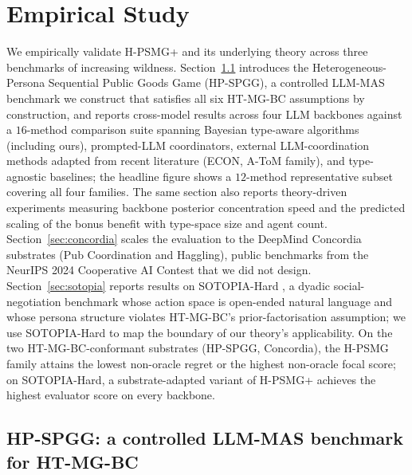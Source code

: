 \documentclass{article}
\def\textsuperscript#1{#1}%
\begin{document}
\section{Empirical Study}
\label{sec:experiments-llm}

We empirically validate H-PSMG\textsuperscript{+} and its underlying theory across
three benchmarks of increasing wildness. Section~\ref{sec:hp-spgg} introduces the
Heterogeneous-Persona Sequential Public Goods Game (HP-SPGG), a controlled LLM-MAS
benchmark we construct that satisfies all six HT-MG-BC assumptions by
construction, and reports cross-model results across four LLM backbones against
a $16$-method comparison suite spanning Bayesian type-aware algorithms (including
ours), prompted-LLM coordinators, external LLM-coordination methods adapted from
recent literature (ECON, A-ToM family), and type-agnostic baselines; the headline
figure shows a $12$-method representative subset covering all four families.
The same section also reports theory-driven experiments measuring backbone
posterior concentration speed and the predicted scaling of the bonus benefit with
type-space size and agent count. Section~\ref{sec:concordia} scales the evaluation
to the DeepMind Concordia substrates (Pub Coordination and Haggling), public
benchmarks from the NeurIPS 2024 Cooperative AI Contest
\citep{vezhnevets2023concordia, concordia_contest2025} that we did not design.
Section~\ref{sec:sotopia} reports results on SOTOPIA-Hard \citep{zhou2024sotopia},
a dyadic social-negotiation benchmark whose action space is open-ended natural
language and whose persona structure violates HT-MG-BC's prior-factorisation
assumption; we use SOTOPIA-Hard to map the boundary of our theory's applicability.
On the two HT-MG-BC-conformant substrates (HP-SPGG, Concordia), the H-PSMG family
attains the lowest non-oracle regret or the highest non-oracle focal score; on
SOTOPIA-Hard, a substrate-adapted variant of H-PSMG\textsuperscript{+} achieves the
highest evaluator score on every backbone.

\subsection{HP-SPGG: a controlled LLM-MAS benchmark for HT-MG-BC}
\label{sec:hp-spgg}
\end{document}

